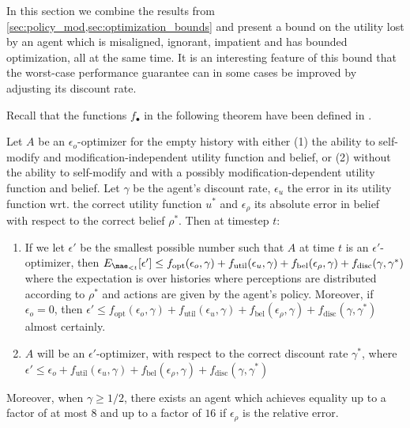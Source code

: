 In this section we combine the results from \cref{sec:policy_mod,sec:optimization_bounds} and present a bound on the utility lost by an agent which is misaligned, ignorant, impatient and has bounded optimization, all at the same time. It is an interesting feature of this bound that the worst-case performance guarantee can in some cases be improved by adjusting its discount rate.

Recall that the functions $f_\bullet$ in the following theorem have been defined in .
\begin{theorem} \label{thm:combining}
Let $A$ be an $\epsilon_o$-optimizer for the empty history with either (1) the ability to self-modify and modification-independent utility function and belief, or (2) without the ability to self-modify and with a possibly modification-dependent utility function and belief. Let $\gamma$ be the agent's discount rate, $\epsilon_u$ the error in its utility function wrt. the correct utility function $u^*$ and $\epsilon_\rho$ its absolute error in belief with respect to the correct belief $\rho^*$. Then at timestep $t$:
\begin{enumerate}[(1)]
\item If we let $\epsilon'$ be the smallest possible number such that $A$ at time $t$ is an $\epsilon'$-optimizer, then $E_{\mae_{<t}}[\epsilon'] \leq f_\text{opt}(\epsilon_o, \gamma) + f_\text{util}(\epsilon_u, \gamma) + f_\text{bel}(\epsilon_\rho, \gamma) + f_\text{disc}(\gamma, \gamma^*)$ where the expectation is over histories where perceptions are distributed according to $\rho^*$ and actions are given by the agent's policy. Moreover, if $\epsilon_o = 0$, then $\epsilon' \leq f_\text{opt}(\epsilon_o, \gamma) + f_\text{util}(\epsilon_u, \gamma) + f_\text{bel}(\epsilon_\rho, \gamma) + f_\text{disc}(\gamma, \gamma^*)$ almost certainly.
\item $A$ will be an $\epsilon'$-optimizer, with respect to the correct discount rate $\gamma^*$, where $\epsilon' \leq \epsilon_o + f_\text{util}(\epsilon_u, \gamma) + f_\text{bel}(\epsilon_\rho, \gamma) + f_\text{disc}(\gamma, \gamma^*)$ 
\end{enumerate}

Moreover, when $\gamma \geq 1/2$, there exists an agent which achieves equality up to a factor of at most $8$ and up to a factor of $16$ if $\epsilon_\rho$ is the relative error.
\end{theorem}

